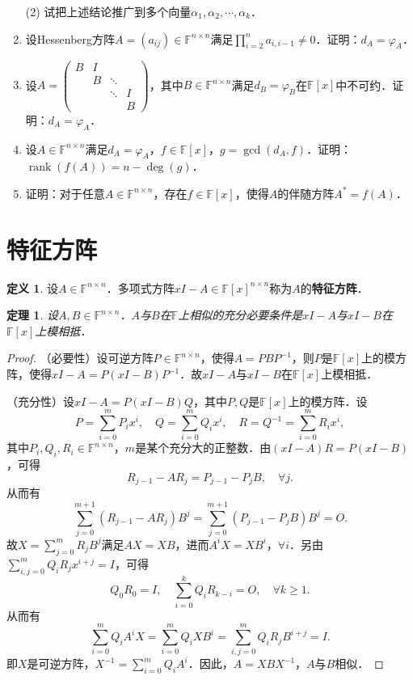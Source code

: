 \documentclass[a4paper,fontset=windows]{ctexbook}
\newtheorem{theorem}{定理}[chapter]
\theoremstyle{definition}
\newtheorem{definition}{定义}[chapter]
\DeclareMathOperator{\rank}{rank}
\renewcommand{\ge}{\geqslant}
\begin{document}
\begin{enumerate}
(2) 试把上述结论推广到多个向量$\alpha_1,\alpha_2,\cdots,\alpha_k$．

\item 设Hessenberg方阵$A=(a_{ij})\in\mathbb{F}^{n\times n}$满足$\prod\limits_{i=2}^na_{i,i-1}\ne 0$．证明：$d_A=\varphi_A$．

\item 设$A=\begin{pmatrix}B&I&& \\ &B&\ddots& \\ &&\ddots&I \\ &&&B\end{pmatrix}$，其中$B\in\mathbb{F}^{n\times n}$满足$d_B=\varphi_B$在$\mathbb{F}[x]$中不可约．证明：$d_A=\varphi_A$．

\item 设$A\in\mathbb{F}^{n\times n}$满足$d_A=\varphi_A$，$f\in\mathbb{F}[x]$，$g=\gcd(d_A,f)$．证明：$\rank(f(A))=n-\deg(g)$．

\item 证明：对于任意$A\in\mathbb{F}^{n\times n}$，存在$f\in\mathbb{F}[x]$，使得$A$的伴随方阵$A^*=f(A)$．

\end{enumerate}

\clearpage\section{特征方阵}

\begin{definition}
设$A\in\mathbb{F}^{n\times n}$．多项式方阵$xI-A\in\mathbb{F}[x]^{n\times n}$称为$A$的{\bf 特征方阵}．
\end{definition}

\begin{theorem}\label{thm5.17}
设$A,B\in\mathbb{F}^{n\times n}$．$A$与$B$在$\mathbb{F}$上相似的充分必要条件是$xI-A$与$xI-B$在$\mathbb{F}[x]$上模相抵．
\end{theorem}

\begin{proof}
（必要性）设可逆方阵$P\in\mathbb{F}^{n\times n}$，使得$A=PBP^{-1}$，则$P$是$\mathbb{F}[x]$上的模方阵，使得$xI-A=P(xI-B)P^{-1}$．故$xI-A$与$xI-B$在$\mathbb{F}[x]$上模相抵．

（充分性）设$xI-A=P(xI-B)Q$，其中$P,Q$是$\mathbb{F}[x]$上的模方阵．设
$$P=\sum_{i=0}^mP_ix^i,\quad Q=\sum_{i=0}^mQ_ix^i,\quad R=Q^{-1}=\sum_{i=0}^mR_ix^i,$$
其中$P_i,Q_i,R_i\in\mathbb{F}^{n\times n}$，$m$是某个充分大的正整数．由$(xI-A)R=P(xI-B)$，可得
$$R_{j-1}-AR_j=P_{j-1}-P_jB,\quad\forall j.$$
从而有
$$\sum_{j=0}^{m+1}(R_{j-1}-AR_j)B^j=\sum_{j=0}^{m+1}(P_{j-1}-P_jB)B^j=O.$$
故$X=\sum\limits_{j=0}^mR_jB^j$满足$AX=XB$，进而$A^iX=XB^i$，$\forall i$．另由$\sum\limits_{i,j=0}^mQ_iR_jx^{i+j}=I$，可得
$$Q_0R_0=I,\quad\sum\limits_{i=0}^kQ_iR_{k-i}=O,\quad\forall k\ge 1.$$
从而有
$$\sum_{i=0}^mQ_iA^iX=\sum_{i=0}^mQ_iXB^i=\sum_{i,j=0}^mQ_iR_jB^{i+j}=I.$$
即$X$是可逆方阵，$X^{-1}=\sum\limits_{i=0}^mQ_iA^i$．因此，$A=XBX^{-1}$，$A$与$B$相似．
\end{proof}
\end{document}
